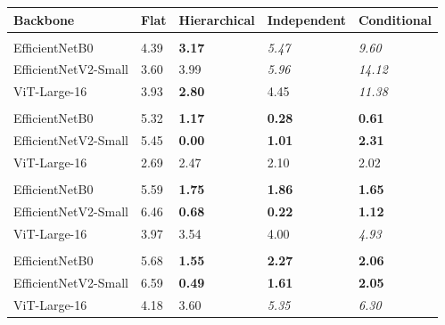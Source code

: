 
\begin{tabular}{lllll}
\toprule
Backbone & Flat & Hierarchical & Independent & Conditional\\
\midrule
\addlinespace[0.3em]
\multicolumn{5}{l}{\textbf{Species}}\\
\hspace{1em}EfficientNetB0 & 4.39 & \textbf{3.17} & \textit{5.47} & \textit{9.60}\\
\hspace{1em}EfficientNetV2-Small & 3.60 & 3.99 & \textit{5.96} & \textit{14.12}\\
\hspace{1em}ViT-Large-16 & 3.93 & \textbf{2.80} & 4.45 & \textit{11.38}\\
\addlinespace[0.3em]
\multicolumn{5}{l}{\textbf{Genus}}\\
\hspace{1em}EfficientNetB0 & 5.32 & \textbf{1.17} & \textbf{0.28} & \textbf{0.61}\\
\hspace{1em}EfficientNetV2-Small & 5.45 & \textbf{0.00} & \textbf{1.01} & \textbf{2.31}\\
\hspace{1em}ViT-Large-16 & 2.69 & 2.47 & 2.10 & 2.02\\
\addlinespace[0.3em]
\multicolumn{5}{l}{\textbf{Family}}\\
\hspace{1em}EfficientNetB0 & 5.59 & \textbf{1.75} & \textbf{1.86} & \textbf{1.65}\\
\hspace{1em}EfficientNetV2-Small & 6.46 & \textbf{0.68} & \textbf{0.22} & \textbf{1.12}\\
\hspace{1em}ViT-Large-16 & 3.97 & 3.54 & 4.00 & \textit{4.93}\\
\addlinespace[0.3em]
\multicolumn{5}{l}{\textbf{Order}}\\
\hspace{1em}EfficientNetB0 & 5.68 & \textbf{1.55} & \textbf{2.27} & \textbf{2.06}\\
\hspace{1em}EfficientNetV2-Small & 6.59 & \textbf{0.49} & \textbf{1.61} & \textbf{2.05}\\
\hspace{1em}ViT-Large-16 & 4.18 & 3.60 & \textit{5.35} & \textit{6.30}\\
\bottomrule
\end{tabular}
